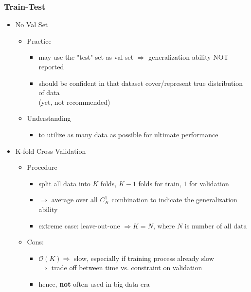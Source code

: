\subsubsection{Train-Test}
\begin{itemize}
\item No Val Set
	\begin{itemize}
	\item Practice
		\begin{itemize}
		\item may use the "test" set as val set $\Rightarrow$ generalization ability NOT reported
		\item should be confident in that dataset cover/represent true distribution of data \\ 
		(yet, not recommended)
		\end{itemize}
	\item Understanding
		\begin{itemize}
		\item to utilize as many data as possible for ultimate performance
		\end{itemize}
	\end{itemize}
	
\item K-fold Cross Validation
	\begin{itemize}
	\item Procedure
		\begin{itemize}
		\item split all data into $K$ folds, $K-1$ folds for train, $1$ for validation
		
		\item $\Rightarrow$ average over all $C^1_K$ combination to indicate the generalization ability
	
		\item extreme case: leave-out-one $\Rightarrow K=N$, where $N$ is number of all data
		\end{itemize}
	
	\item Cons:
		\begin{itemize}
		\item $\mathcal O(K) \Rightarrow$ slow, especially if training process already slow \\
		$\Rightarrow$ trade off between time vs. constraint on validation
		\item hence, \textbf{not} often used in big data era
		\end{itemize}
	\end{itemize}
\end{itemize}

